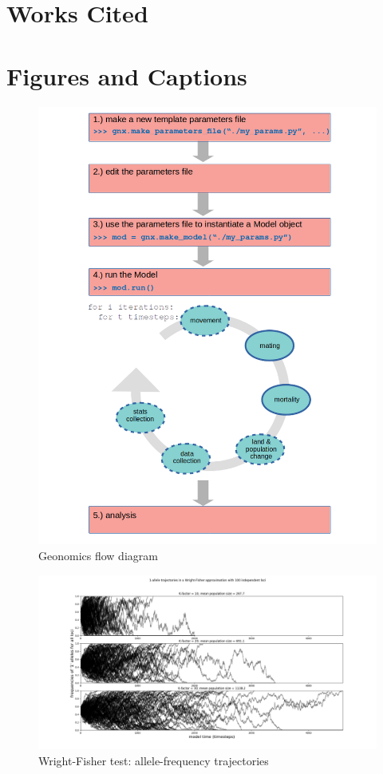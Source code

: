 ﻿\documentclass{article}
\begin{document}
\section{Works Cited}




\section{Figures and Captions}

\begin{figure}[h!]
\includegraphics[width=125mm]{./img/flow_diagram.png}
\caption{Geonomics flow diagram}
\end{figure}


\begin{figure}[h!]
\includegraphics[width=175mm]{./img/validation/wf/allele_trajectories.png}
        \caption{Wright-Fisher test: allele-frequency trajectories}
\end{figure}
\end{document}
